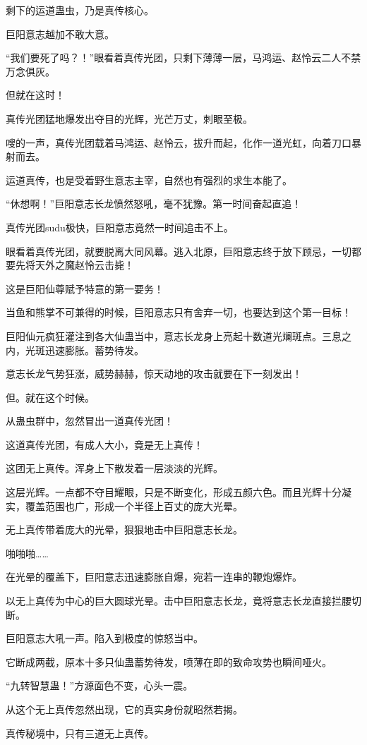 \begin{this_body}
剩下的运道蛊虫，乃是真传核心。

巨阳意志越加不敢大意。

“我们要死了吗？！”眼看着真传光团，只剩下薄薄一层，马鸿运、赵怜云二人不禁万念俱灰。

但就在这时！

真传光团猛地爆发出夺目的光辉，光芒万丈，刺眼至极。

嗖的一声，真传光团载着马鸿运、赵怜云，拔升而起，化作一道光虹，向着刀口暴射而去。

运道真传，也是受着野生意志主宰，自然也有强烈的求生本能了。

“休想啊！”巨阳意志长龙愤然怒吼，毫不犹豫。第一时间奋起直追！

真传光团sudu极快，巨阳意志竟然一时间追击不上。

眼看着真传光团，就要脱离大同风幕。逃入北原，巨阳意志终于放下顾忌，一切都要先将天外之魔赵怜云击毙！

这是巨阳仙尊赋予特意的第一要务！

当鱼和熊掌不可兼得的时候，巨阳意志只有舍弃一切，也要达到这个第一目标！

巨阳仙元疯狂灌注到各大仙蛊当中，意志长龙身上亮起十数道光斓斑点。三息之内，光斑迅速膨胀。蓄势待发。

意志长龙气势狂涨，威势赫赫，惊天动地的攻击就要在下一刻发出！

但。就在这个时候。

从蛊虫群中，忽然冒出一道真传光团！

这道真传光团，有成人大小，竟是无上真传！

这团无上真传。浑身上下散发着一层淡淡的光辉。

这层光辉。一点都不夺目耀眼，只是不断变化，形成五颜六色。而且光辉十分凝实，覆盖范围也广，形成一个半径上百丈的庞大光晕。

无上真传带着庞大的光晕，狠狠地击中巨阳意志长龙。

啪啪啪……

在光晕的覆盖下，巨阳意志迅速膨胀自爆，宛若一连串的鞭炮爆炸。

以无上真传为中心的巨大圆球光晕。击中巨阳意志长龙，竟将意志长龙直接拦腰切断。

巨阳意志大吼一声。陷入到极度的惊怒当中。

它断成两截，原本十多只仙蛊蓄势待发，喷薄在即的致命攻势也瞬间哑火。

“九转智慧蛊！”方源面色不变，心头一震。

从这个无上真传忽然出现，它的真实身份就昭然若揭。

真传秘境中，只有三道无上真传。


\end{this_body}
